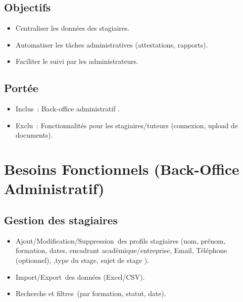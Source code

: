 \documentclass{report}
\begin{document}
\subsection*{Objectifs}
\begin{itemize}
  \item Centraliser les données des stagiaires.
  \item Automatiser les tâches administratives (attestations, rapports).
  \item Faciliter le suivi par les administrateurs.
\end{itemize}
\subsection*{Portée}
\begin{itemize}
  \item Inclus : Back-office administratif .
  \item Exclu : Fonctionnalités pour les stagiaires/tuteurs (connexion, upload de documents).
\end{itemize}
\section*{Besoins Fonctionnels (Back-Office Administratif)}
\subsection*{Gestion des stagiaires}
\begin{itemize}
  \item Ajout/Modification/Suppression des profils stagiaires (nom, prénom, formation, dates, encadrant académique/entreprise, Email, Téléphone (optionnel), ,type du stage, sujet de stage ).
  \item Import/Export des données (Excel/CSV).
  \item Recherche et filtres (par formation, statut, date).
\end{itemize}
\end{document}
